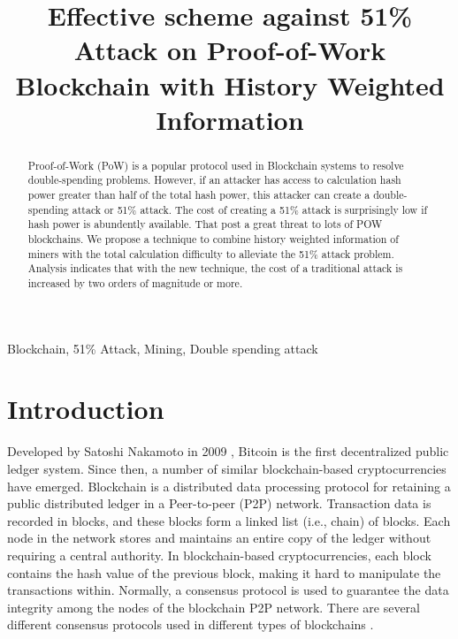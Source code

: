 \documentclass[conference]{IEEEtran}
\begin{document}
\title{Effective scheme against 51\% Attack on Proof-of-Work Blockchain with History Weighted Information\\
}

\author{
}

\maketitle

\begin{abstract}
Proof-of-Work (PoW) is a popular protocol used in Blockchain systems to resolve double-spending problems. However, if an attacker has access to calculation hash power greater than half of the total hash power, this attacker can create a double-spending attack or 51\% attack. The cost of creating a 51\% attack is surprisingly low if hash power is abundently available. That post a great threat to lots of POW blockchains. We propose a technique to combine history weighted information of miners with the total calculation difficulty to alleviate the 51\% attack problem. Analysis indicates that with the new technique, the cost of a traditional attack is increased by two orders of magnitude or more.
\end{abstract}


\begin{IEEEkeywords}
Blockchain, 51\% Attack, Mining, Double spending attack
\end{IEEEkeywords}

\section{Introduction}
Developed by Satoshi Nakamoto in 2009 \cite{b1}, Bitcoin is the first decentralized public ledger system. Since then, a number of similar blockchain-based cryptocurrencies have emerged. Blockchain is a distributed data processing protocol for retaining a public distributed ledger in a Peer-to-peer (P2P) network. Transaction data is recorded in blocks, and these blocks form a linked list (i.e., chain) of blocks. Each node in the network stores and maintains an entire copy of the ledger without requiring a central authority. In blockchain-based cryptocurrencies, each block contains the hash value of the previous block, making it hard to manipulate the transactions within. Normally, a consensus protocol is used to guarantee the data integrity among the nodes of the blockchain P2P network. There are several different consensus protocols used in different types of blockchains \cite{b2}.
\end{document}
